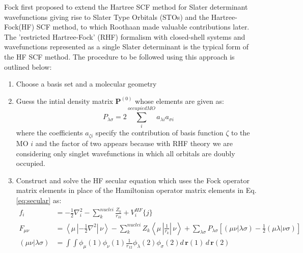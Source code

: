             Fock first proposed to extend the Hartree SCF method for Slater determinant wavefunctions giving rise to Slater Type Orbitals (STOs) and the Hartree-Fock(HF) SCF method$\allowbreak$, to which Roothaan \cite{Roothaan1951} made valuable contributions later. The 'restricted Hartree-Fock' (RHF) formalism with closed-shell systems and wavefunctions represented as a single Slater determinant is the typical form of the HF SCF method. The procedure to be followed using this approach is outlined below:
            \begin{enumerate}
                \item Choose a basis set and a molecular geometry
                \item Guess the intial density matrix $\mathbf{P}^{(0)}$ whose elements are given as:
                    \begin{equation}\label{eq:density matrix elements}
                        P_{\lambda \sigma} = 2 \displaystyle\sum_i^{occupied MO} a_{\lambda i} a_{\sigma i}
                    \end{equation}
                    where the coefficients $a_{\zeta i}$ specify the contribution of basis function $\zeta$ to the MO $i$ and the factor of two appears because with RHF theory we are considering only singlet wavefunctions in which all orbitals are doubly occupied.
                \item Construct and solve the HF secular equation which uses the Fock operator matrix elements in place of the Hamiltonian operator matrix elements in Eq. \eqref{eq:secular} as:
                    \begin{equation}\label{eq:one electron Fock matrix elements}
                        \begin{aligned}
                            f_i &= -\frac{1}{2} \nabla^2_i - \displaystyle\sum_k^{nuclei} \frac{Z_k}{r_{ik}} + V_i^{HF} \{j\}\\
                            F_{\mu \nu} &= \left< \mu \,\left| -\frac{1}{2} \nabla^2 \right|\,\nu \right> - \displaystyle\sum_k^{nuclei} Z_k \left< \mu \,\left| \frac{1}{r_k} \right| \, \nu \right> + \displaystyle\sum_{\lambda \sigma} P_{\lambda \sigma} \left[ (\mu \nu | \lambda \sigma) - \frac{1}{2} (\mu \lambda | \nu \sigma) \right]\\
                            (\mu \nu | \lambda \sigma) &= \displaystyle\int \int \phi_\mu (1) \phi_\nu(1) \frac{1}{r_{12}}\phi_\lambda (2) \phi_\sigma (2) d\,\mathbf{r}(1)\,d\,\mathbf{r}(2)
                        \end{aligned}                    

\end{equation}
\end{enumerate}
